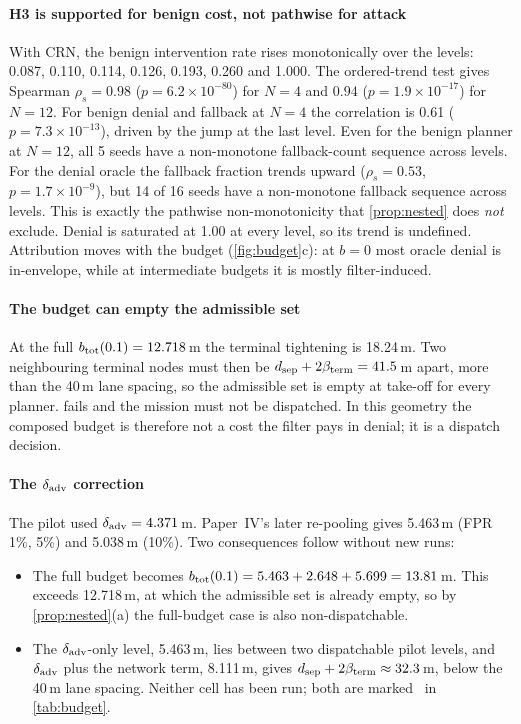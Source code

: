 \paragraph{H3 is supported for benign cost, not pathwise for attack} With
CRN, the benign intervention rate rises monotonically over the levels:
0.087, 0.110, 0.114, 0.126, 0.193, 0.260 and 1.000. The ordered-trend test
gives Spearman $\rho_s=0.98$ ($p=6.2\times10^{-80}$) for $N=4$ and $0.94$
($p=1.9\times10^{-17}$) for $N=12$. For benign denial and fallback at $N=4$ the correlation is
0.61 ($p=7.3\times10^{-13}$), driven by the jump at the last level. Even
for the benign planner at $N=12$, all 5 seeds have a non-monotone
fallback-count sequence across levels. For the denial oracle the fallback fraction
trends upward ($\rho_s=0.53$, $p=1.7\times10^{-9}$), but 14 of 16 seeds have a
non-monotone fallback sequence across levels. This is exactly the pathwise
non-monotonicity that \cref{prop:nested} does \emph{not} exclude. Denial is
saturated at 1.00 at every level, so its trend is undefined. Attribution
moves with the budget (\cref{fig:budget}c): at $b=0$ most oracle denial is
in-envelope, while at intermediate budgets it is mostly filter-induced.

\paragraph{The budget can empty the admissible set} At the full
$b_{\mathrm{tot}}(0.1)=12.718$\,m the terminal tightening is 18.24\,m. Two neighbouring
terminal nodes must then be $d_{\mathrm{sep}}+2\beta_{\mathrm{term}}=41.5$\,m apart, more than
the 40\,m lane spacing, so the admissible set is empty at take-off for every
planner.  fails and the mission must not be dispatched. In this
geometry the composed budget is therefore not a cost the filter pays in
denial; it is a dispatch decision.

\paragraph{The $\delta_{\mathrm{adv}}$ correction} The pilot used $\delta_{\mathrm{adv}}=4.371$\,m.
Paper~IV's later re-pooling gives 5.463\,m (FPR 1\%, 5\%) and 5.038\,m
(10\%). Two consequences follow without new runs:
\begin{itemize}
\item The full budget becomes
  $b_{\mathrm{tot}}(0.1)=5.463+2.648+5.699=13.81$\,m. This exceeds 12.718\,m, at which
  the admissible set is already empty, so by \cref{prop:nested}(a) the
  full-budget case is also non-dispatchable.
\item The $\delta_{\mathrm{adv}}$-only level, 5.463\,m, lies between two dispatchable
  pilot levels, and $\delta_{\mathrm{adv}}$ plus the network term, 8.111\,m, gives
  $d_{\mathrm{sep}}+2\beta_{\mathrm{term}}\approx32.3$\,m, below the 40\,m lane spacing.
  Neither cell has been run; both are marked \pending\ in \cref{tab:budget}.
\end{itemize}

